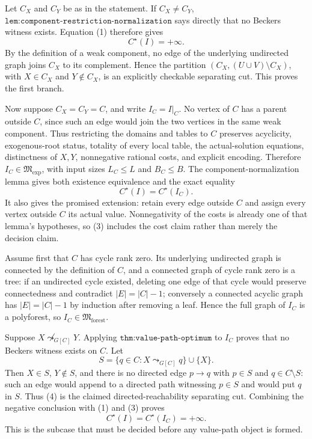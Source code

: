 Let \(C_X\) and \(C_Y\) be as in the statement.  If \(C_X\ne C_Y\), \(\texttt{lem:component-restriction-normalization}\) says directly that no Beckers witness exists.  Equation (1) therefore gives
\[
 C^\star(I)=+\infty.                                                       \tag{2}
\]
By the definition of a weak component, no edge of the underlying undirected graph joins \(C_X\) to its complement.  Hence the partition \((C_X,(U\cup V)\setminus C_X)\), with \(X\in C_X\) and \(Y\notin C_X\), is an explicitly checkable separating cut.  This proves the first branch.

Now suppose \(C_X=C_Y=C\), and write \(I_C=I|_C\).  No vertex of \(C\) has a parent outside \(C\), since such an edge would join the two vertices in the same weak component.  Thus restricting the domains and tables to \(C\) preserves acyclicity, exogenous-root status, totality of every local table, the actual-solution equations, distinctness of \(X,Y\), nonnegative rational costs, and explicit encoding.  Therefore \(I_C\in\mathfrak M_{\mathrm{exp}}\), with input sizes \(L_C\le L\) and \(B_C\le B\).  The component-normalization lemma gives both existence equivalence and the exact equality
\[
 C^\star(I)=C^\star(I_C).                                                  \tag{3}
\]
It also gives the promised extension: retain every edge outside \(C\) and assign every vertex outside \(C\) its actual value.  Nonnegativity of the costs is already one of that lemma's hypotheses, so (3) includes the cost claim rather than merely the decision claim.

Assume first that \(C\) has cycle rank zero.  Its underlying undirected graph is connected by the definition of \(C\), and a connected graph of cycle rank zero is a tree: if an undirected cycle existed, deleting one edge of that cycle would preserve connectedness and contradict \(|E|=|C|-1\); conversely a connected acyclic graph has \(|E|=|C|-1\) by induction after removing a leaf.  Hence the full graph of \(I_C\) is a polyforest, so \(I_C\in\mathfrak M_{\mathrm{forest}}\).

Suppose \(X\not\leadsto_{G[C]}Y\).  Applying \(\texttt{thm:value-path-optimum}\) to \(I_C\) proves that no Beckers witness exists on \(C\).  Let
\[
 S=\{q\in C:X\leadsto_{G[C]}q\}\cup\{X\}.                               \tag{4}
\]
Then \(X\in S\), \(Y\notin S\), and there is no directed edge \(p\to q\) with \(p\in S\) and \(q\in C\setminus S\): such an edge would append to a directed path witnessing \(p\in S\) and would put \(q\) in \(S\).  Thus (4) is the claimed directed-reachability separating cut.  Combining the negative conclusion with (1) and (3) proves
\[
 C^\star(I)=C^\star(I_C)=+\infty.                                         \tag{5}
\]
This is the subcase that must be decided before any value-path object is formed.

